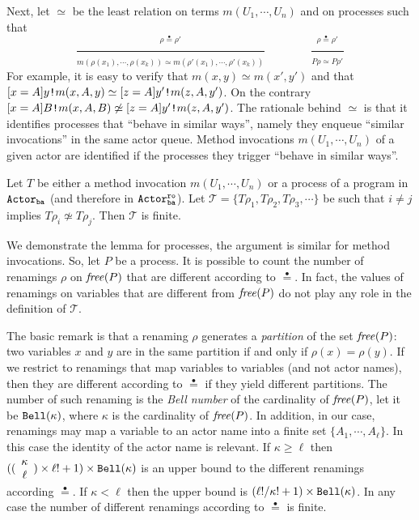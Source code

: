 \documentclass{LMCS}
\newcommand{\cal}{\mathcal}
\theoremstyle{plain}\newtheorem{proposition}[thm]{Proposition}
\theoremstyle{plain}\newtheorem{lemma}[thm]{Lemma}
\theoremstyle{plain}\newtheorem{theorem}[thm]{Theorem}
\theoremstyle{plain}\newtheorem{corollary}[thm]{Corollary}
\newif\ifconf \conffalse
\newcommand{\bigfract}[2]{\frac{^{\textstyle #1}}{_{\textstyle #2}}}
\newcommand{\combinator}[2]{\begin{array}{c}{\small #1} \\ {\small #2} \end{array}}
\newcommand{\invk}{\mbox{\tt !}}
\newcommand{\free}[1]{{\it free}(#1)}
\newcommand{\eqdot}{\stackrel{\bullet}{=}}
\newcommand{\actba}{${\tt Actor_{\tt ba}}$}
\newcommand{\actroba}{${\tt Actor^{\tt ro}_{\tt ba}}$}
\begin{document}
Next, let $\simeq$ be the least relation on terms $m(U_1, \cdots , U_n)$ and on processes such that
{\small
\[
\bigfract{ \rho \eqdot \rho'
	}{
	m(\rho(x_1), \cdots, \rho(x_k)) \simeq m(\rho'(x_1), \cdots, 
	\rho'(x_k))
	}
\qquad \qquad
\bigfract{ \rho \eqdot \rho'
	}{
	P\rho \simeq P\rho'
	}
\]
}
For example, it is easy to verify that $m(x,y) \simeq m(x',y')$ and that
$[x = A] y \invk m(x,A,y) \simeq 
[z = A] y' \invk m(z,A,y')$. On the contrary 
$[x = A] B \invk m(x,A,B) \not \simeq 
[z = A] y' \invk m(z,A,y')$. The rationale behind $\simeq$ is that it
identifies  processes that ``behave in similar ways'', namely they
enqueue ``similar invocations'' in the same actor queue. Method invocations
$m(U_1, \cdots , U_n)$ of a given actor 
are identified if the processes they trigger
 ``behave in similar ways''.


\begin{lem}
\label{prop.finteterms}
Let $T$ be either a method invocation $m(U_1, \cdots , U_n)$ or a process of a program in {\actba} (and therefore in {\actroba}).
Let ${\cal T} = \{ T \rho_1, T\rho_2, T\rho_3, \cdots \}$ be
such that $i \neq j$ implies $T \rho_i \not \simeq T \rho_j$. 
Then ${\cal T}$ is finite.
\end{lem}

\ifconf
\else
\proof
 We demonstrate the lemma for processes, the argument is similar for 
method invocations. So, let  $P$ be a process. It is possible to count the 
number of renamings $\rho$ on $\free{P}$ that are different according to
$\eqdot$. In fact, the values of renamings on variables that are 
different from  $\free{P}$ do not play any role in the definition of ${\cal T}$.

The basic remark is that a renaming $\rho$ generates a \emph{partition} of the
set $\free{P}$: two variables $x$ and $y$ are in the same partition if and only
if $\rho(x) = \rho(y)$. If we restrict to renamings that map variables to
variables (and not actor names), then they are different according to 
$\eqdot$ if they
yield different partitions. The number of such renaming is the 
\emph{Bell number} of the cardinality of $\free{P}$, let it be
${\tt Bell}(\kappa)$, where $\kappa$ is the cardinality of $\free{P}$. In 
addition, in our case, renamings may map a variable 
to an actor name into a finite set $\{A_1, \cdots, A_\ell\}$. In this case
the identity of the actor name is relevant. If $\kappa \geq \ell$ then 
$((\combinator{\kappa}{\ell}) \times \ell! +1)\times {\tt Bell}(\kappa)$ is an upper bound to the different renamings according $\eqdot$. If $\kappa < \ell$ then
the upper bound is $(\ell! / \kappa! +1 )\times {\tt Bell}(\kappa)$. In any case
the number of different renamings according to $\eqdot$ is finite.
\end{document}
